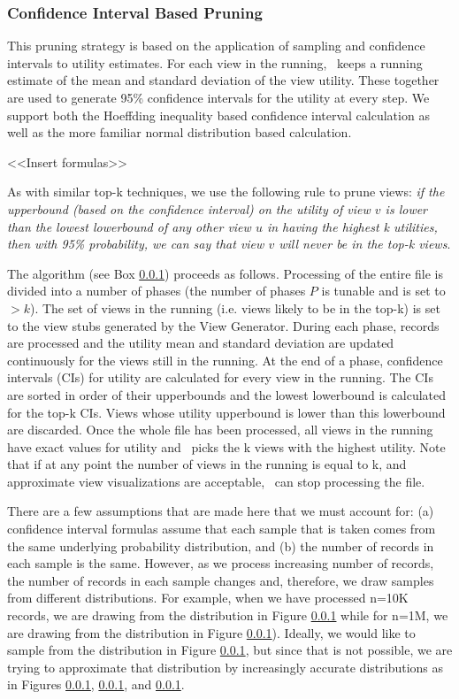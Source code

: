 \subsubsection{Confidence Interval Based Pruning}
This pruning strategy is based on the application of sampling and confidence
intervals to utility estimates. 
For each view in the running, \SeeDB\ keeps a
running estimate of the mean and standard deviation of the view utility. 
These
together are used to generate 95\% confidence intervals for the utility at every
step. 
We support both the Hoeffding inequality based confidence interval calculation
as well as the more familiar normal distribution based calculation.

<<Insert formulas>>

As with similar top-k techniques, we use the following rule
to prune views: {\it if the upperbound (based on the confidence interval) on the
utility of view $v$ is lower than the lowest lowerbound of any other view $u$
in having the highest k utilities, then with 95\% probability, we can say
that view $v$ will never be in the top-k views}.

The algorithm (see Box \ref{}) proceeds as follows. 
Processing of the entire
file is divided into a number of phases (the number of phases $P$ is tunable
and is set to $>$$k$). 
The set of views in the running (i.e. views likely to be in the top-k) is set to
the view stubs generated by the View Generator.
During each phase, records are
processed and the utility mean and standard deviation are updated
continuously for the views still in the running.
At the end of a phase, confidence intervals (CIs) for utility are calculated for
every view in the running. 
The CIs are sorted in order of their upperbounds and the lowest lowerbound is
calculated for the top-k CIs. 
Views whose utility upperbound is lower than this lowerbound are discarded.
Once the whole file has been processed, all views in the running have
exact values for utility and \SeeDB\ picks the k views with the highest utility.
Note that if at any point the number of views in the running is equal to k, and
approximate view visualizations are acceptable, \SeeDB\ can stop processing the
file.

There are a few assumptions that are made here that we must account for: (a)
confidence interval formulas assume that each sample that is taken comes from
the same underlying probability distribution, and (b) the number of records in
each sample is the same. However, as we process increasing number of records,
the number of records in each sample changes and, therefore, we draw samples
from different distributions.
For example, when we have processed n=10K records, we are drawing from the
distribution in Figure \ref{} while for n=1M, we are drawing from the
distribution in Figure \ref{}).
Ideally, we would like to sample from the distribution in Figure \ref{}, but
since that is not possible, we are trying to approximate that distribution by
increasingly accurate distributions as in Figures \ref{}, \ref{}, and \ref{}.

